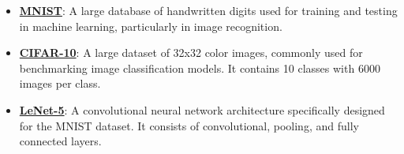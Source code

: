 \documentclass{article}%
\begin{document}
\begin{itemize}[leftmargin=*]
\item \href{https://purdue.brightspace.com/d2l/common/assets/pdfjs-d2l-dist/1.0.14-legacy/web/viewer.html?file=%2Fcontent%2Fenforced%2F1095467-wl.202510.CS.24300.001%2F09L1-cnn.pdf%3Fou%3D1095467&lang=en-us&container=d2l-fileviewer-rendered-pdf&fullscreen=d2l-fileviewer-rendered-pdf-dialog&height=667#page=21}{\textbf{MNIST}}: A large database of handwritten digits used for training and testing in machine learning, particularly in image recognition.%
\item \href{https://purdue.brightspace.com/d2l/common/assets/pdfjs-d2l-dist/1.0.14-legacy/web/viewer.html?file=%2Fcontent%2Fenforced%2F1095467-wl.202510.CS.24300.001%2F09L1-cnn.pdf%3Fou%3D1095467&lang=en-us&container=d2l-fileviewer-rendered-pdf&fullscreen=d2l-fileviewer-rendered-pdf-dialog&height=667#page=23}{\textbf{CIFAR-10}}: A large dataset of 32x32 color images, commonly used for benchmarking image classification models. It contains 10 classes with 6000 images per class.%
\item \href{https://purdue.brightspace.com/d2l/common/assets/pdfjs-d2l-dist/1.0.14-legacy/web/viewer.html?file=%2Fcontent%2Fenforced%2F1095467-wl.202510.CS.24300.001%2F09L1-cnn.pdf%3Fou%3D1095467&lang=en-us&container=d2l-fileviewer-rendered-pdf&fullscreen=d2l-fileviewer-rendered-pdf-dialog&height=667#page=22}{\textbf{LeNet-5}}: A convolutional neural network architecture specifically designed for the MNIST dataset. It consists of convolutional, pooling, and fully connected layers.%
\end{itemize}

%
\end{document}

